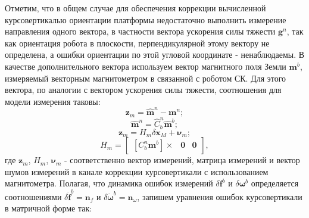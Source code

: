 \documentclass[14pt]{article}
\begin{document}
Отметим, что в общем случае для обеспечения  коррекции вычисленной курсовертикалью ориентации платформы недостаточно выполнить измерение направления одного вектора, в частности вектора ускорения силы тяжести $\boldsymbol g^n$, так как ориентация робота в плоскости, перпендикулярной этому вектору не определена, а ошибки ориентации по этой угловой координате - ненаблюдаемы.  
В качестве дополнительного вектора используем вектор магнитного поля Земли $\boldsymbol m^b$, измеряемый векторным магнитометром в связанной с роботом СК. 
Для этого вектора, по аналогии с вектором ускорения силы тяжести, соотношения для  модели измерения таковы:
\begin{equation}
\boldsymbol z_m = \hat{\boldsymbol m}^n - {\boldsymbol m}^n;
\end{equation}
\begin{equation}
\hat{\boldsymbol m}^n = \hat{C}_b^n \hat{\boldsymbol m}^b;
\end{equation}
\begin{equation}
\boldsymbol z_m = H_m \delta \boldsymbol x_{M} + \boldsymbol\nu_m;
\end{equation}
\begin{equation}\label{equ:ahrs_measurements_stop}
H_m = \begin{bmatrix}\left[C_b^n \boldsymbol m^b\right]\times & \boldsymbol 0 & \boldsymbol 0\end{bmatrix},
\end{equation}
где $\boldsymbol z_m$, $H_m$, $\boldsymbol\nu_m$ - соответственно вектор измерений, матрица измерений и вектор шумов измерений в канале коррекции курсовертикали с использованием магнитометра.
Полагая, что  динамика ошибок измерений $\delta \boldsymbol f^b$ и $\delta\boldsymbol\omega^b$ определяется соотношениями $\delta \dot{\boldsymbol f}^b = \boldsymbol n_f$  и $\delta \dot{\boldsymbol \omega}^b = \boldsymbol n_\omega$,  запишем уравнения ошибок курсовертикали в матричной форме  так:
\end{document}

